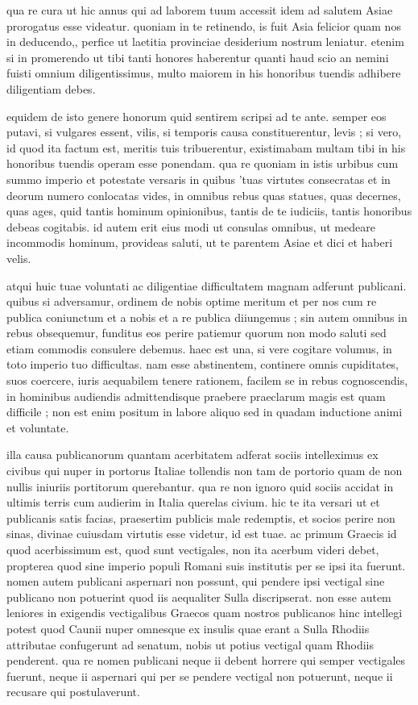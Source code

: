  qua re cura ut hic annus qui ad laborem tuum accessit idem ad salutem Asiae prorogatus esse videatur. quoniam in te retinendo, is fuit Asia felicior quam nos in deducendo,, perfice ut laetitia provinciae desiderium nostrum leniatur. etenim si in promerendo ut tibi tanti honores haberentur quanti haud scio an nemini fuisti omnium diligentissimus, multo maiorem in his honoribus tuendis adhibere diligentiam debes.

 equidem de isto genere honorum quid sentirem scripsi ad te ante. semper eos putavi, si vulgares essent, vilis, si temporis causa constituerentur, levis ; si vero, id quod ita factum est, meritis tuis tribuerentur, existimabam multam tibi in his honoribus tuendis operam esse ponendam. qua re quoniam in istis urbibus cum summo imperio et potestate versaris in quibus 'tuas virtutes consecratas et in deorum numero conlocatas vides, in omnibus rebus quas statues, quas decernes, quas ages, quid tantis hominum opinionibus, tantis de te iudiciis, tantis honoribus debeas cogitabis. id autem erit eius modi ut consulas omnibus, ut medeare incommodis hominum, provideas saluti, ut te parentem Asiae et dici et haberi velis.

 atqui huic tuae voluntati ac diligentiae difficultatem magnam adferunt publicani. quibus si adversamur, ordinem de nobis optime meritum et per nos cum re publica coniunctum et a nobis et a re publica diiungemus ; sin autem omnibus in rebus obsequemur, funditus eos perire patiemur quorum non modo saluti sed etiam commodis consulere debemus. haec est una, si vere cogitare volumus, in toto imperio tuo difficultas. nam esse abstinentem, continere omnis cupiditates, suos coercere, iuris aequabilem tenere rationem, facilem se in rebus cognoscendis, in hominibus audiendis admittendisque praebere praeclarum magis est quam difficile ; non est enim positum in labore aliquo sed in quadam inductione animi et voluntate.

 illa causa publicanorum quantam acerbitatem adferat sociis intelleximus ex civibus qui nuper in portorus Italiae tollendis non tam de portorio quam de non nullis iniuriis portitorum querebantur. qua re non ignoro quid sociis accidat in ultimis terris cum audierim in Italia querelas civium. hic te ita versari ut et publicanis satis facias, praesertim publicis male redemptis, et socios perire non sinas, divinae cuiusdam virtutis esse videtur, id est tuae. ac primum Graecis id quod acerbissimum est, quod sunt vectigales, non ita acerbum videri debet, propterea quod sine imperio populi Romani suis institutis per se ipsi ita fuerunt. nomen autem publicani aspernari non possunt, qui pendere ipsi vectigal sine publicano non potuerint quod iis aequaliter Sulla discripserat. non esse autem leniores in exigendis vectigalibus Graecos quam nostros publicanos hinc intellegi potest quod Caunii nuper omnesque ex insulis quae erant a Sulla Rhodiis attributae confugerunt ad senatum, nobis ut potius vectigal quam Rhodiis penderent. qua re nomen publicani neque ii debent horrere qui semper vectigales fuerunt, neque ii aspernari qui per se pendere vectigal non potuerunt, neque ii recusare qui postulaverunt.

